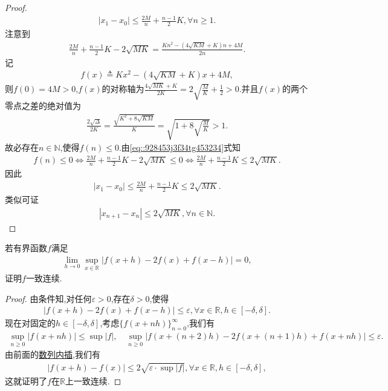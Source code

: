 \documentclass[../../main.tex]{subfiles}
\begin{document}
\begin{proof}
\begin{align*}
|x_1 - x_0| \leqslant \frac{2M}{n} + \frac{n-1}{2}K, \forall n \geqslant 1.
\end{align*}
注意到
\begin{align}
\frac{2M}{n} + \frac{n-1}{2}K - 2\sqrt{MK} = \frac{Kn^2 - (4\sqrt{KM} + K)n + 4M}{2n}. \label{eq::928453j3f34tg453234}
\end{align}
记
\begin{align*}
f(x) \triangleq Kx^2 - (4\sqrt{KM} + K)x + 4M,
\end{align*}
则$f(0) = 4M > 0$,$f(x)$的对称轴为$\frac{4\sqrt{MK} + K}{2K} = 2\sqrt{\frac{M}{K}} + \frac{1}{2} > 0$.并且$f(x)$的两个零点之差的绝对值为
\begin{align*}
\frac{2\sqrt{\Delta}}{2K} = \frac{\sqrt{K^2 + 8\sqrt{KM}}}{K} = \sqrt{1 + 8\sqrt{\frac{M}{K}}} > 1.
\end{align*}
故必存在$n \in \mathbb{N}$,使得$f(n) \leqslant 0$.由\eqref{eq::928453j3f34tg453234}式知
\begin{align*}
f(n) \leqslant 0 \Longleftrightarrow \frac{2M}{n} + \frac{n-1}{2}K - 2\sqrt{MK} \leqslant 0 \Longleftrightarrow \frac{2M}{n} + \frac{n-1}{2}K \leqslant 2\sqrt{MK}.
\end{align*}
因此
\begin{align*}
|x_1 - x_0| \leqslant \frac{2M}{n} + \frac{n-1}{2}K \leqslant 2\sqrt{MK}.
\end{align*}
类似可证
\begin{align*}
|x_{n+1} - x_n| \leqslant 2\sqrt{MK}, \forall n \in \mathbb{N}.
\end{align*}

\end{proof}

\begin{example}
若有界函数$f$满足
\begin{align*}
\lim_{h \to 0} \sup_{x \in \mathbb{R}} |f(x + h) - 2f(x) + f(x - h)| = 0,
\end{align*}
证明$f$一致连续.
\end{example}
\begin{proof}
由条件知,对任何$\varepsilon > 0$,存在$\delta > 0$,使得
\begin{align*}
|f(x + h) - 2f(x) + f(x - h)| \leqslant \varepsilon, \forall x \in \mathbb{R}, h \in [-\delta, \delta].
\end{align*}
现在对固定的$h \in [-\delta, \delta]$,考虑$\{f(x + nh)\}_{n=0}^\infty$,我们有
\begin{align*}
\sup_{n \geqslant 0} |f(x + nh)| \leqslant \sup |f|,\quad \sup_{n \geqslant 0} |f(x + (n + 2)h) - 2f(x + (n + 1)h) + f(x + nh)| \leqslant \varepsilon.
\end{align*}
由前面的\hyperref[proposition:数列内插]{数列内插},我们有
\begin{align*}
|f(x + h) - f(x)| \leqslant 2\sqrt{\varepsilon \cdot \sup |f|}, \forall x \in \mathbb{R}, h \in [-\delta, \delta],
\end{align*}
这就证明了$f$在$\mathbb{R}$上一致连续.

\end{proof}
\end{document}
